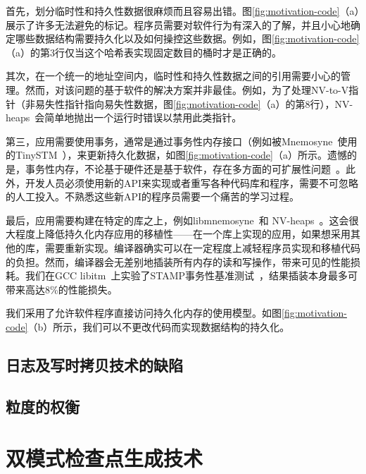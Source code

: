 首先，划分临时性和持久性数据很麻烦而且容易出错。图\ref{fig:motivation-code}（a）展示了许多无法避免的标记。程序员需要对软件行为有深入的了解，并且小心地确定哪些数据结构需要持久化以及如何操控这些数据。例如，图\ref{fig:motivation-code}（a）的第3行仅当这个哈希表实现固定数目的桶时才是正确的。

其次，在一个统一的地址空间内，临时性和持久性数据之间的引用需要小心的管理。然而，对该问题的基于软件的解决方案并非最佳。例如，为了处理NV-to-V指针（非易失性指针指向易失性数据，图\ref{fig:motivation-code}（a）的第8行），NV-heaps~\cite{Coburn:2011:NMP:1950365.1950380}会简单地抛出一个运行时错误以禁用此类指针。

第三，应用需要使用事务，通常是通过事务性内存接口（例如被Mnemosyne~\cite{Volos:2011:MLP:1950365.1950379}使用的TinySTM~\cite{Felber:2008:DPT}），来更新持久化数据，如图\ref{fig:motivation-code}（a）所示。遗憾的是，事务性内存，不论基于硬件还是基于软件，存在多方面的可扩展性问题~\cite{Cascaval:2008:STM:1454456.1454466,Pankratius:2011:STM:1989493.1989500,Dice:2009:EEC:1508244.1508263}。此外，开发人员必须使用新的API来实现或者重写各种代码库和程序，需要不可忽略的人工投入。不熟悉这些新API的程序员需要一个痛苦的学习过程。

最后，应用需要构建在特定的库之上，例如libmnemosyne~\cite{Volos:2011:MLP:1950365.1950379}和
NV-heaps~\cite{Coburn:2011:NMP:1950365.1950380}。这会很大程度上降低持久化内存应用的移植性——在一个库上实现的应用，如果想采用其他的库，需要重新实现。编译器确实可以在一定程度上减轻程序员实现和移植代码的负担。然而，编译器会无差别地插装所有内存的读和写操作，带来可见的性能损耗。我们在GCC libitm~\cite{libitm}上实验了STAMP事务性基准测试~\cite{Cao:2008:STA}，结果插装本身最多可带来高达8\%的性能损失。

我们采用了允许软件程序直接访问持久化内存的使用模型。如图\ref{fig:motivation-code}（b）所示，我们可以不更改代码而实现数据结构的持久化。

\subsection{日志及写时拷贝技术的缺陷}



\subsection{粒度的权衡}

\section{双模式检查点生成技术}

